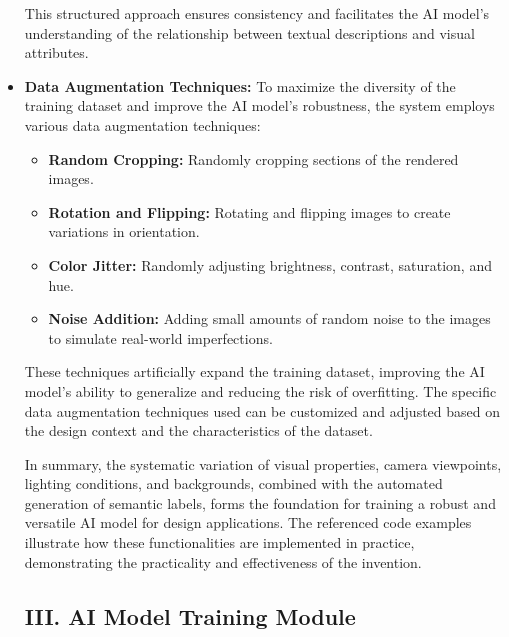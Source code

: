\documentclass{article}
\begin{document}
\begin{itemize}
This structured approach ensures consistency and facilitates the AI model's understanding of the relationship between textual descriptions and visual attributes.

\item \textbf{Data Augmentation Techniques:} To maximize the diversity of the training dataset and improve the AI model's robustness, the system employs various data augmentation techniques:

\begin{itemize}
    \item \textbf{Random Cropping:} Randomly cropping sections of the rendered images.
    \item \textbf{Rotation and Flipping:} Rotating and flipping images to create variations in orientation.
    \item \textbf{Color Jitter:} Randomly adjusting brightness, contrast, saturation, and hue.
    \item \textbf{Noise Addition:} Adding small amounts of random noise to the images to simulate real-world imperfections.
\end{itemize}

These techniques artificially expand the training dataset, improving the AI model's ability to generalize and reducing the risk of overfitting. The specific data augmentation techniques used can be customized and adjusted based on the design context and the characteristics of the dataset.

In summary, the systematic variation of visual properties, camera viewpoints, lighting conditions, and backgrounds, combined with the automated generation of semantic labels, forms the foundation for training a robust and versatile AI model for design applications. The referenced code examples illustrate how these functionalities are implemented in practice, demonstrating the practicality and effectiveness of the invention.

\subsection{III. AI Model Training Module}






\end{itemize}
\end{document}

